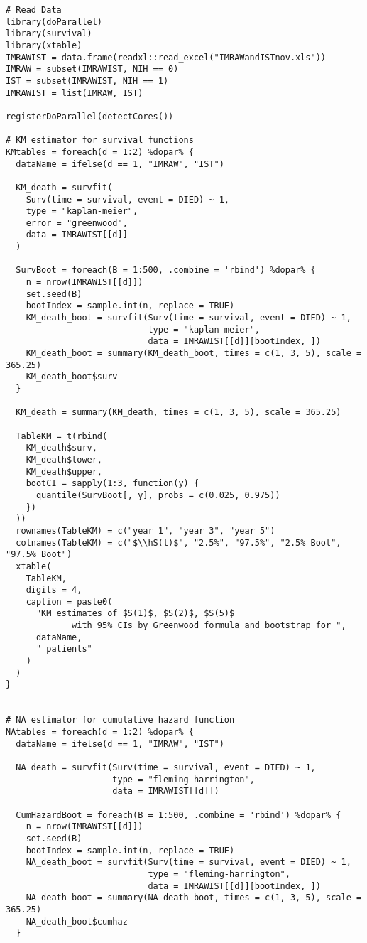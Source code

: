 \documentclass[11pt]{article}
\newcommand{\hS}{\hat{S}}
\begin{document}
\begin{lstlisting}
# Read Data
library(doParallel)
library(survival)
library(xtable)
IMRAWIST = data.frame(readxl::read_excel("IMRAWandISTnov.xls"))
IMRAW = subset(IMRAWIST, NIH == 0)
IST = subset(IMRAWIST, NIH == 1)
IMRAWIST = list(IMRAW, IST)

registerDoParallel(detectCores())

# KM estimator for survival functions
KMtables = foreach(d = 1:2) %dopar% {
  dataName = ifelse(d == 1, "IMRAW", "IST")
  
  KM_death = survfit(
    Surv(time = survival, event = DIED) ~ 1,
    type = "kaplan-meier",
    error = "greenwood",
    data = IMRAWIST[[d]]
  )
  
  SurvBoot = foreach(B = 1:500, .combine = 'rbind') %dopar% {
    n = nrow(IMRAWIST[[d]])
    set.seed(B)
    bootIndex = sample.int(n, replace = TRUE)
    KM_death_boot = survfit(Surv(time = survival, event = DIED) ~ 1,
                            type = "kaplan-meier",
                            data = IMRAWIST[[d]][bootIndex, ])
    KM_death_boot = summary(KM_death_boot, times = c(1, 3, 5), scale = 365.25)
    KM_death_boot$surv
  }
  
  KM_death = summary(KM_death, times = c(1, 3, 5), scale = 365.25)
  
  TableKM = t(rbind(
    KM_death$surv,
    KM_death$lower,
    KM_death$upper,
    bootCI = sapply(1:3, function(y) {
      quantile(SurvBoot[, y], probs = c(0.025, 0.975))
    })
  ))
  rownames(TableKM) = c("year 1", "year 3", "year 5")
  colnames(TableKM) = c("$\\hS(t)$", "2.5%", "97.5%", "2.5% Boot", "97.5% Boot")
  xtable(
    TableKM,
    digits = 4,
    caption = paste0(
      "KM estimates of $S(1)$, $S(2)$, $S(5)$
             with 95% CIs by Greenwood formula and bootstrap for ",
      dataName,
      " patients"
    )
  )
}


# NA estimator for cumulative hazard function
NAtables = foreach(d = 1:2) %dopar% {
  dataName = ifelse(d == 1, "IMRAW", "IST")
  
  NA_death = survfit(Surv(time = survival, event = DIED) ~ 1,
                     type = "fleming-harrington",
                     data = IMRAWIST[[d]])
  
  CumHazardBoot = foreach(B = 1:500, .combine = 'rbind') %dopar% {
    n = nrow(IMRAWIST[[d]])
    set.seed(B)
    bootIndex = sample.int(n, replace = TRUE)
    NA_death_boot = survfit(Surv(time = survival, event = DIED) ~ 1,
                            type = "fleming-harrington",
                            data = IMRAWIST[[d]][bootIndex, ])
    NA_death_boot = summary(NA_death_boot, times = c(1, 3, 5), scale = 365.25)
    NA_death_boot$cumhaz
  }
  

\end{lstlisting}
\end{document}
